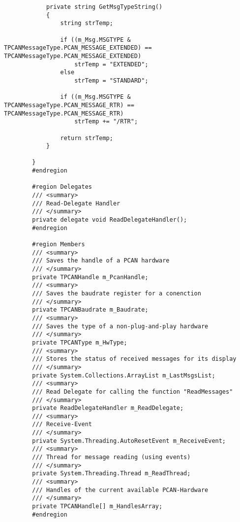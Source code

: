 \begin{lstlisting}
            private string GetMsgTypeString()
            {
                string strTemp;

                if ((m_Msg.MSGTYPE & TPCANMessageType.PCAN_MESSAGE_EXTENDED) == TPCANMessageType.PCAN_MESSAGE_EXTENDED)
                    strTemp = "EXTENDED";
                else
                    strTemp = "STANDARD";

                if ((m_Msg.MSGTYPE & TPCANMessageType.PCAN_MESSAGE_RTR) == TPCANMessageType.PCAN_MESSAGE_RTR)
                    strTemp += "/RTR";

                return strTemp;
            }

        }
        #endregion

        #region Delegates
        /// <summary>
        /// Read-Delegate Handler
        /// </summary>
        private delegate void ReadDelegateHandler();
        #endregion

        #region Members
        /// <summary>
        /// Saves the handle of a PCAN hardware
        /// </summary>
        private TPCANHandle m_PcanHandle;
        /// <summary>
        /// Saves the baudrate register for a conenction
        /// </summary>
        private TPCANBaudrate m_Baudrate;
        /// <summary>
        /// Saves the type of a non-plug-and-play hardware
        /// </summary>
        private TPCANType m_HwType;
        /// <summary>
        /// Stores the status of received messages for its display
        /// </summary>
        private System.Collections.ArrayList m_LastMsgsList;
        /// <summary>
        /// Read Delegate for calling the function "ReadMessages"
        /// </summary>
        private ReadDelegateHandler m_ReadDelegate;
        /// <summary>
        /// Receive-Event
        /// </summary>
        private System.Threading.AutoResetEvent m_ReceiveEvent;
        /// <summary>
        /// Thread for message reading (using events)
        /// </summary>
        private System.Threading.Thread m_ReadThread;
        /// <summary>
        /// Handles of the current available PCAN-Hardware
        /// </summary>
        private TPCANHandle[] m_HandlesArray;
        #endregion


\end{lstlisting}
